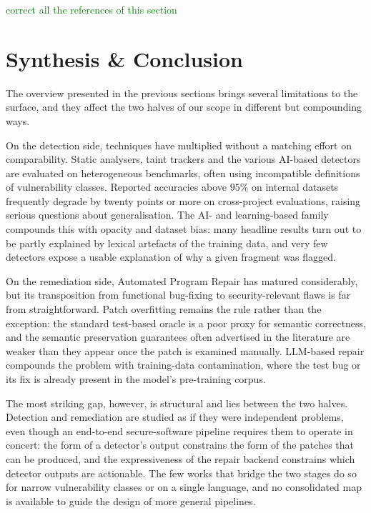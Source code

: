 \textcolor{green}{correct all the references of this section}

\section{Synthesis \& Conclusion}
\label{sec:research-problem}

The overview presented in the previous sections brings several
limitations to the surface, and they affect the two halves of our
scope in different but compounding ways.

On the detection side, techniques have multiplied without a matching
effort on comparability. Static analysers, taint trackers and the
various AI-based detectors are evaluated on heterogeneous benchmarks,
often using incompatible definitions of vulnerability classes. Reported
accuracies above $95\%$ on internal datasets frequently degrade by
twenty points or more on cross-project evaluations, raising serious
questions about generalisation. The AI- and learning-based family
compounds this with opacity and dataset bias: many headline results
turn out to be partly explained by lexical artefacts of the training
data, and very few detectors expose a usable explanation of why a
given fragment was flagged.

On the remediation side, Automated Program Repair has matured
considerably, but its transposition from functional bug-fixing to
security-relevant flaws is far from straightforward. Patch overfitting
remains the rule rather than the exception: the standard test-based
oracle is a poor proxy for semantic correctness, and the semantic
preservation guarantees often advertised in the literature are weaker
than they appear once the patch is examined manually. LLM-based repair
compounds the problem with training-data contamination, where the test
bug or its fix is already present in the model's pre-training corpus.

The most striking gap, however, is structural and lies between the two
halves. Detection and remediation are studied as if they were
independent problems, even though an end-to-end secure-software
pipeline requires them to operate in concert: the form of a
detector's output constrains the form of the patches that can be
produced, and the expressiveness of the repair backend constrains
which detector outputs are actionable. The few works that bridge the
two stages do so for narrow vulnerability classes or on a single
language, and no consolidated map is available to guide the design of
more general pipelines.

